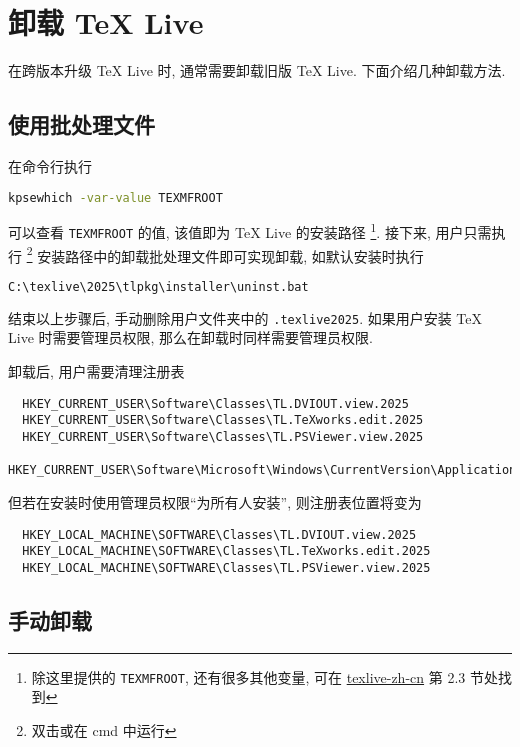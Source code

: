 \section{卸载 \TeX{} Live}

在跨版本升级 \TeX{} Live 时, 通常需要卸载旧版 \TeX{} Live.
下面介绍几种卸载方法.

\subsection{使用批处理文件}

在命令行执行
\begin{lstlisting}[language=bash]
  kpsewhich -var-value TEXMFROOT
\end{lstlisting}
可以查看 \texttt{TEXMFROOT} 的值,
该值即为 \TeX{} Live 的安装路径%
\footnote{%
  除这里提供的 \texttt{TEXMFROOT}, 还有很多其他变量, 可在
  \href{https://www.tug.org/texlive/doc/texlive-zh-cn/texlive-zh-cn.pdf}{texlive-zh-cn}
  第 2.3 节处找到
}. 
接下来,
用户只需执行%
\footnote{双击或在 \textsf{cmd} 中运行}%
安装路径中的卸载批处理文件即可实现卸载, 如默认安装时执行
\begin{lstlisting}[language=bash]
  C:\texlive\2025\tlpkg\installer\uninst.bat
\end{lstlisting}
结束以上步骤后,
手动删除用户文件夹中的 \texttt{.texlive2025}.
如果用户安装 \TeX{} Live 时需要管理员权限,
那么在卸载时同样需要管理员权限.

卸载后,
用户需要清理注册表
\begin{lstlisting}
  HKEY_CURRENT_USER\Software\Classes\TL.DVIOUT.view.2025
  HKEY_CURRENT_USER\Software\Classes\TL.TeXworks.edit.2025
  HKEY_CURRENT_USER\Software\Classes\TL.PSViewer.view.2025
  HKEY_CURRENT_USER\Software\Microsoft\Windows\CurrentVersion\ApplicationAssociationToasts\TL.TeXworks.edit.2025_.tex
\end{lstlisting}
但若在安装时使用管理员权限``为所有人安装'',
则注册表位置将变为
\begin{lstlisting}
  HKEY_LOCAL_MACHINE\SOFTWARE\Classes\TL.DVIOUT.view.2025
  HKEY_LOCAL_MACHINE\SOFTWARE\Classes\TL.TeXworks.edit.2025
  HKEY_LOCAL_MACHINE\SOFTWARE\Classes\TL.PSViewer.view.2025
\end{lstlisting}

\subsection{手动卸载}

